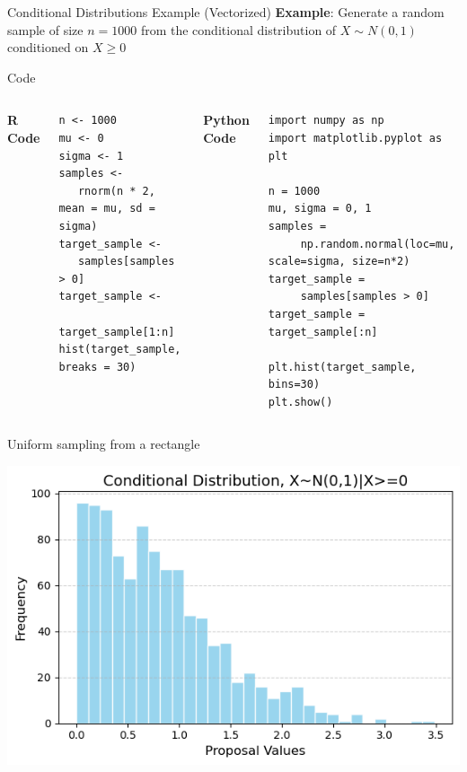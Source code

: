\documentclass[8pt]{beamer}
\begin{document}
\begin{frame}[fragile]{Conditional Distributions Example (Vectorized)}
\textbf{Example}: Generate a random sample of size $n=1000$ from the conditional distribution of $X \sim N(0,1) $ conditioned on $X\geq 0$

\vspace{2mm}

\alert{Code}
\begin{columns}
\textbf{R Code}

\begin{lstlisting}
n <- 1000
mu <- 0
sigma <- 1
samples <- 
   rnorm(n * 2, mean = mu, sd = sigma)
target_sample <-
   samples[samples > 0]
target_sample <- 
   target_sample[1:n]
hist(target_sample, breaks = 30)
\end{lstlisting}

\textbf{Python Code}

\begin{lstlisting}
import numpy as np
import matplotlib.pyplot as plt

n = 1000
mu, sigma = 0, 1
samples =
     np.random.normal(loc=mu, scale=sigma, size=n*2) 
target_sample = 
     samples[samples > 0]                        
target_sample = target_sample[:n]                         

plt.hist(target_sample, bins=30)
plt.show()
\end{lstlisting}

\end{columns}
\end{frame}


\begin{frame}{Uniform sampling from a rectangle}
\begin{center}
\includegraphics[scale=0.6]{chapter1-part4-plot1.png}
\end{center}
\end{frame}
\end{document}
